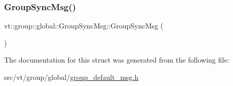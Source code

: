 \subsubsection{\texorpdfstring{Group\+Sync\+Msg()}{GroupSyncMsg()}}
{\footnotesize\ttfamily vt\+::group\+::global\+::\+Group\+Sync\+Msg\+::\+Group\+Sync\+Msg (\begin{DoxyParamCaption}{ }\end{DoxyParamCaption})\hspace{0.3cm}{\ttfamily [default]}}



The documentation for this struct was generated from the following file\+:\begin{DoxyCompactItemize}
\item 
src/vt/group/global/\hyperlink{group__default__msg_8h}{group\+\_\+default\+\_\+msg.\+h}\end{DoxyCompactItemize}

